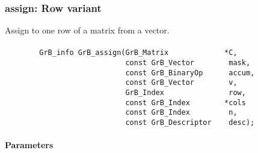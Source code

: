 \subsubsection{{\sf assign}: Row variant}

Assign to one row of a matrix from a vector.  

\paragraph{\syntax}

\begin{verbatim}
        GrB_info GrB_assign(GrB_Matrix             *C,
                            const GrB_Vector        mask,
                            const GrB_BinaryOp      accum,
                            const GrB_Vector        v,
                            GrB_Index               row,
                            const GrB_Index        *cols
                            const GrB_Index         n,
                            const GrB_Descriptor    desc); 
\end{verbatim}

\paragraph{Parameters}

